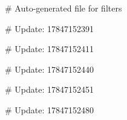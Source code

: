 # Auto-generated file for filters

# Update: 17847152391

# Update: 17847152411

# Update: 17847152440

# Update: 17847152451

# Update: 17847152480
